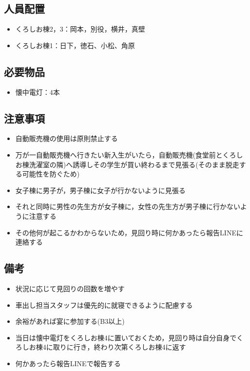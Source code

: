 




\subsection{人員配置}
\begin{itemize}
\item くろしお棟2，3：岡本，別役，横井，真壁
\item くろしお棟1：日下，徳石、小松、角原
\end{itemize}


\subsection{必要物品}
\begin{itemize}
\item 懐中電灯：4本
\end{itemize}


\subsection{注意事項}
\begin{itemize}
\item 自動販売機の使用は原則禁止する
\item 万が一自動販売機へ行きたい新入生がいたら，自動販売機(食堂前とくろしお棟洗濯室の隣)へ誘導しその学生が買い終わるまで見張る(そのまま脱走する可能性を防ぐため)
\item 女子棟に男子が，男子棟に女子が行かないように見張る
\item それと同時に男性の先生方が女子棟に，女性の先生方が男子棟に行かないように注意する
\item その他何が起こるかわからないため，見回り時に何かあったら報告LINEに連絡する
\end{itemize}


\subsection{備考}
\begin{itemize}
\item 状況に応じて見回りの回数を増やす
\item 車出し担当スタッフは優先的に就寝できるように配慮する
\item 余裕があれば宴に参加する(B3以上)
\item 当日は懐中電灯をくろしお棟4に置いておくため，見回り時は自分自身でくろしお棟4に取りに行き，終わり次第くろしお棟4に返す
\item 何かあったら報告LINEで報告する
\end{itemize}

%
